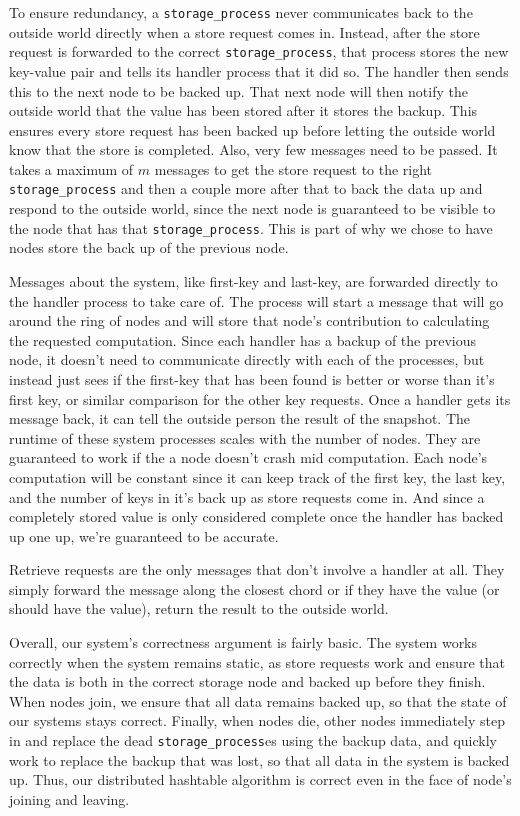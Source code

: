 \documentclass[12pt,letterpaper]{article}
\renewcommand{\tt}[1]{\texttt{#1}}
\renewcommand{\sp}{\tt{storage\_process}}
\begin{document}
To ensure redundancy, a \sp{} never communicates back to the outside world directly when a store request comes in. Instead, after the store request is forwarded to the correct \sp, that process stores the new key-value pair and tells its handler process that it did so. The handler then sends this to the next node to be backed up. That next node will then notify the outside world that the value has been stored after it stores the backup. This ensures every store request has been backed up before letting the outside world know that the store is completed. Also, very few messages need to be passed. It takes a maximum of $m$ messages to get the store request to the right \sp{} and then a couple more after that to back the data up and respond to the outside world, since the next node is guaranteed to be visible to the node that has that \sp. This is part of why we chose to have nodes store the back up of the previous node.

Messages about the system, like first-key and last-key, are forwarded directly to the handler process to take care of. The process will start a message that will go around the ring of nodes and will store that node's contribution to calculating the requested computation. Since each handler has a backup of the previous node, it doesn't need to communicate directly with each of the processes, but instead just sees if the first-key that has been found is better or worse than it's first key, or similar comparison for the other key requests. Once a handler gets its message back, it can tell the outside person the result of the snapshot. The runtime of these system processes scales with the number of nodes. They are guaranteed to work if the a node doesn't crash mid computation. Each node's computation will be constant since it can keep track of the first key, the last key, and the number of keys in it's back up as store requests come in. And since a completely stored value is only considered complete once the handler has backed up one up, we're guaranteed to be accurate.

Retrieve requests are the only messages that don't involve a handler at all. They simply forward the message along the closest chord or if they have the value (or should have the value), return the result to the outside world.

Overall, our system's correctness argument is fairly basic. The system works correctly when the system remains static, as store requests work and ensure that the data is both in the correct storage node and backed up before they finish. When nodes join, we ensure that all data remains backed up, so that the state of our systems stays correct. Finally, when nodes die, other nodes immediately step in and replace the dead \sp es using the backup data, and quickly work to replace the backup that was lost, so that all data in the system is backed up. Thus, our distributed hashtable algorithm is correct even in the face of node's joining and leaving.
\end{document}
